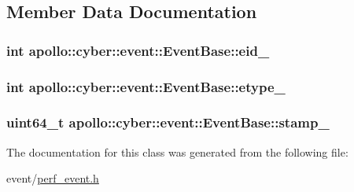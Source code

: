 \subsection{Member Data Documentation}
\hypertarget{classapollo_1_1cyber_1_1event_1_1EventBase_a1d9e13642a28e712a16bff0224e0b6fe}{
\subsubsection[{eid\-\_\-}]{\setlength{\rightskip}{0pt plus 5cm}int apollo\-::cyber\-::event\-::\-Event\-Base\-::eid\-\_\-\hspace{0.3cm}{\ttfamily [protected]}}}\label{classapollo_1_1cyber_1_1event_1_1EventBase_a1d9e13642a28e712a16bff0224e0b6fe}
\hypertarget{classapollo_1_1cyber_1_1event_1_1EventBase_ae26baa01961de359956540b4e5f98ad5}{
\subsubsection[{etype\-\_\-}]{\setlength{\rightskip}{0pt plus 5cm}int apollo\-::cyber\-::event\-::\-Event\-Base\-::etype\-\_\-\hspace{0.3cm}{\ttfamily [protected]}}}\label{classapollo_1_1cyber_1_1event_1_1EventBase_ae26baa01961de359956540b4e5f98ad5}
\hypertarget{classapollo_1_1cyber_1_1event_1_1EventBase_afaeda733409e3addc6e7f839b694333d}{
\subsubsection[{stamp\-\_\-}]{\setlength{\rightskip}{0pt plus 5cm}uint64\-\_\-t apollo\-::cyber\-::event\-::\-Event\-Base\-::stamp\-\_\-\hspace{0.3cm}{\ttfamily [protected]}}}\label{classapollo_1_1cyber_1_1event_1_1EventBase_afaeda733409e3addc6e7f839b694333d}


The documentation for this class was generated from the following file\-:\begin{DoxyCompactItemize}
\item 
event/\hyperlink{perf__event_8h}{perf\-\_\-event.\-h}\end{DoxyCompactItemize}
